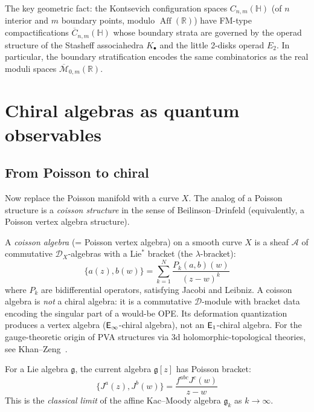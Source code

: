 The key geometric fact: the Kontsevich configuration spaces $C_{n,m}(\mathbb{H})$ (of $n$ interior and $m$ boundary points, modulo $\operatorname{Aff}(\mathbb{R})$) have FM-type compactifications $\overline{C}_{n,m}(\mathbb{H})$ whose boundary strata are governed by the operad structure of the Stasheff associahedra $K_\bullet$ and the little 2-disks operad $E_2$. In particular, the boundary stratification encodes the same combinatorics as the real moduli spaces $\overline{\mathcal{M}}_{0,m}(\mathbb{R})$.

\section{Chiral algebras as quantum observables}

\subsection{From Poisson to chiral}

Now replace the Poisson manifold with a curve $X$.  The analog of a Poisson
structure is a \emph{coisson structure} in the sense of Beilinson--Drinfeld
(equivalently, a Poisson vertex algebra structure).

\begin{remark}
\label{rem:coisson-curve}
A \emph{coisson algebra} (= Poisson vertex algebra) on a smooth curve $X$
is a sheaf $\mathcal{A}$ of commutative $\mathcal{D}_X$-algebras with a
Lie$^*$ bracket (the $\lambda$-bracket):
\[\{a(z), b(w)\} = \sum_{k=1}^N \frac{P_k(a,b)(w)}{(z-w)^k}\]
where $P_k$ are bidifferential operators, satisfying Jacobi and Leibniz.
A coisson algebra is \emph{not} a chiral algebra: it is a commutative
$\mathcal{D}$-module with bracket data encoding the singular part of a
would-be OPE.  Its deformation quantization produces a vertex algebra
($\mathsf{E}_{\infty}$-chiral algebra), not an $\mathsf{E}_1$-chiral algebra.  For the gauge-theoretic origin of PVA structures via 3d holomorphic-topological theories, see Khan--Zeng~\cite{KhanZeng25}.
\end{remark}

\begin{example}
For a Lie algebra $\mathfrak{g}$, the current algebra $\mathfrak{g}[z]$ has Poisson bracket:
\[\{J^a(z), J^b(w)\} = \frac{f^{abc} J^c(w)}{z-w}\]
This is the \emph{classical limit} of the affine Kac--Moody algebra $\widehat{\mathfrak{g}}_k$ as $k \to \infty$.
\end{example}


